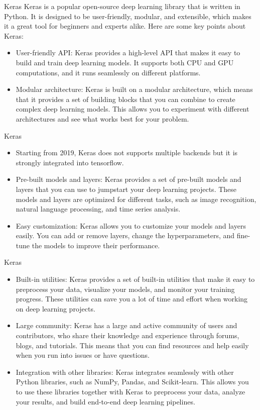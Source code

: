 \documentclass[11pt]{beamer}
\begin{document}
\begin{frame}{Keras}
Keras is a popular open-source deep learning library that is written in Python. It is designed to be user-friendly, modular, and extensible, which makes it a great tool for beginners and experts alike. Here are some key points about Keras:
\begin{itemize}
\item User-friendly API: Keras provides a high-level API that makes it easy to build and train deep learning models. It supports both CPU and GPU computations, and it runs seamlessly on different platforms.
\item Modular architecture: Keras is built on a modular architecture, which means that it provides a set of building blocks that you can combine to create complex deep learning models. This allows you to experiment with different architectures and see what works best for your problem.
\end{itemize}
\end{frame}
%
%
\begin{frame}{Keras}
\begin{itemize}
\item Starting from 2019, Keras does not supports multiple backends but it is strongly integrated into tensorflow.
\item Pre-built models and layers: Keras provides a set of pre-built models and layers that you can use to jumpstart your deep learning projects. These models and layers are optimized for different tasks, such as image recognition, natural language processing, and time series analysis.
\item Easy customization: Keras allows you to customize your models and layers easily. You can add or remove layers, change the hyperparameters, and fine-tune the models to improve their performance.
\end{itemize}
\end{frame}
%
%
\begin{frame}{Keras}
\begin{itemize}
\item Built-in utilities: Keras provides a set of built-in utilities that make it easy to preprocess your data, visualize your models, and monitor your training progress. These utilities can save you a lot of time and effort when working on deep learning projects.

\item Large community: Keras has a large and active community of users and contributors, who share their knowledge and experience through forums, blogs, and tutorials. This means that you can find resources and help easily when you run into issues or have questions.

\item Integration with other libraries: Keras integrates seamlessly with other Python libraries, such as NumPy, Pandas, and Scikit-learn. This allows you to use these libraries together with Keras to preprocess your data, analyze your results, and build end-to-end deep learning pipelines.
\end{itemize}
\end{frame}
\end{document}
